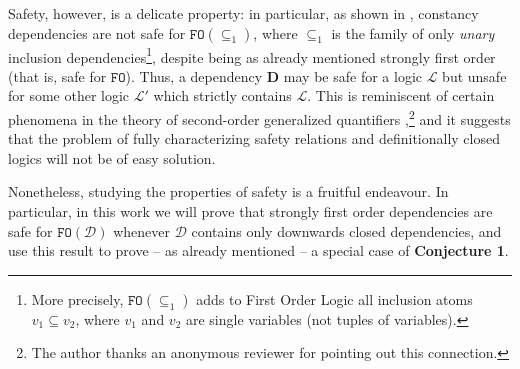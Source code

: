 \documentclass{article}
\theoremstyle{definition}
\newcommand{\FO}{\texttt{FO}}
\newcommand{\D}{\mathbf D}
\newcommand{\DD}{\mathcal D}
\newcommand{\LL}{\mathcal L}
\begin{document}
Safety, however, is a delicate property: in particular, as shown in \cite{galliani2018safe}, constancy dependencies are not safe for $\FO(\subseteq_1)$, where $\subseteq_1$ is the family of only \emph{unary} inclusion dependencies\footnote{More precisely, $\FO(\subseteq_1)$ adds to First Order Logic all inclusion atoms $v_1 \subseteq v_2$, where $v_1$ and $v_2$ are single variables (not tuples of variables).}, despite being as already mentioned strongly first order (that is, safe for $\FO$). Thus, a dependency $\D$ may be safe for a logic $\LL$ but unsafe for some other logic $\LL'$ which strictly contains $\LL$. This is reminiscent of certain phenomena in the theory of second-order generalized quantifiers \cite{kontinen2010definability},\footnote{The author thanks an anonymous reviewer for pointing out this connection.} and it suggests that the problem of fully characterizing safety relations and definitionally closed logics will not be of easy solution. 

Nonetheless, studying the properties of safety is a fruitful endeavour. In particular, in this work we will prove that strongly first order dependencies are safe for $\FO(\DD)$ whenever $\DD$ contains only downwards closed dependencies, and use this result to prove -- as already mentioned -- a special case of \textbf{Conjecture 1}. 
\end{document}

